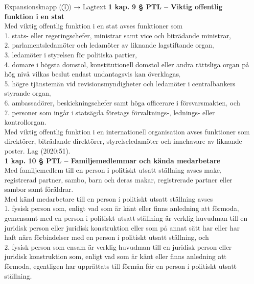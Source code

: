 \documentclass[10pt]{beamer}
\begin{document}
\begin{frame}[label=riskfragor-steg1]
\begin{alertblock}{Expansionsknapp (ⓘ) → Lagtext}
    \tiny \textbf{1 kap. 9 § PTL – Viktig offentlig funktion i en stat}\\
    \tiny Med viktig offentlig funktion i en stat avses funktioner som\\
    \tiny   1. stats- eller regeringschefer, ministrar samt vice och biträdande ministrar,\\
    \tiny   2. parlamentsledamöter och ledamöter av liknande lagstiftande organ,\\
    \tiny   3. ledamöter i styrelsen för politiska partier,\\
    \tiny   4. domare i högsta domstol, konstitutionell domstol eller andra rättsliga organ på hög nivå vilkas beslut endast undantagsvis kan överklagas,\\
    \tiny   5. högre tjänstemän vid revisionsmyndigheter och ledamöter i centralbankers styrande organ,\\
    \tiny   6. ambassadörer, beskickningschefer samt höga officerare i försvarsmakten, och\\
    \tiny   7. personer som ingår i statsägda företags förvaltnings-, lednings- eller kontrollorgan.\\

    \tiny Med viktig offentlig funktion i en internationell organisation avses funktioner som direktörer, biträdande direktörer, styrelseledamöter och innehavare av liknande poster.
          Lag (2020:51).\\[0.1cm]

    \tiny \textbf{1 kap. 10 § PTL – Familjemedlemmar och kända medarbetare}\\
    \tiny Med familjemedlem till en person i politiskt utsatt ställning avses make,
     registrerad partner, sambo, barn och deras makar, registrerade partner eller sambor samt föräldrar.\\

    \tiny Med känd medarbetare till en person i politiskt utsatt ställning avses\\
    \tiny  1. fysisk person som, enligt vad som är känt eller finns anledning att förmoda,
     gemensamt med en person i politiskt utsatt ställning är verklig huvudman till en juridisk person 
     eller juridisk konstruktion eller som på annat sätt har eller har haft nära förbindelser med en 
     person i politiskt utsatt ställning, och\\
    \tiny  2. fysisk person som ensam är verklig huvudman till en juridisk person eller juridisk konstruktion som, enligt vad som är känt eller finns anledning att förmoda, egentligen har upprättats till förmån för en person i politiskt utsatt ställning.


\end{alertblock}
\end{frame}
\end{document}
